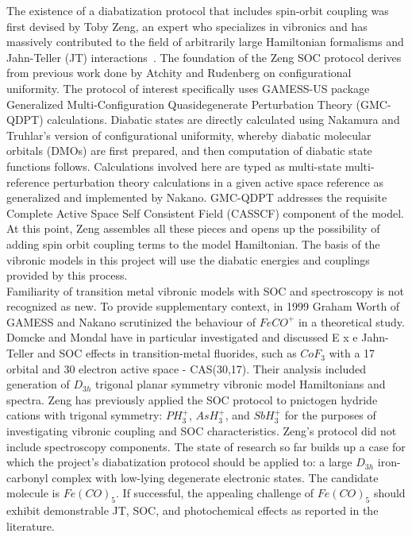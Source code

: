 The existence of a diabatization protocol that includes spin-orbit coupling was first devised by Toby Zeng, an expert who specializes in vibronics and has massively contributed to the field of arbitrarily large Hamiltonian formalisms and Jahn-Teller (JT) interactions~\cite{zeng2017diabatization}. The foundation of the Zeng SOC protocol derives from previous work done by Atchity and Rudenberg on configurational uniformity. The protocol of interest specifically uses GAMESS-US package Generalized Multi-Configuration Quasidegenerate Perturbation Theory (GMC-QDPT) calculations. Diabatic states are directly calculated using Nakamura and Truhlar's version of configurational uniformity, whereby diabatic molecular orbitals (DMOs) are first prepared, and then computation of diabatic state functions follows. Calculations involved here are typed as multi-state multi-reference perturbation theory calculations in a given active space reference as generalized and implemented by Nakano. GMC-QDPT addresses the requisite Complete Active Space Self Consistent Field (CASSCF) component of the model. At this point, Zeng assembles all these pieces and opens up the possibility of adding spin orbit coupling terms to the model Hamiltonian. The basis of the vibronic models in this project will use the diabatic energies and couplings provided by this process. \\ 

Familiarity of transition metal vibronic models with SOC and spectroscopy is not recognized as new. To provide supplementary context, in 1999 Graham Worth of GAMESS and Nakano scrutinized the behaviour of $FeCO^+$ in a theoretical study. Domcke and Mondal have in particular investigated and discussed E x e Jahn-Teller and SOC effects in transition-metal fluorides, such as $CoF_3$ with a 17 orbital and 30 electron active space - CAS(30,17). Their analysis included generation of $D_{3h}$ trigonal planar symmetry vibronic model Hamiltonians and spectra. Zeng has previously applied the SOC protocol to pnictogen hydride cations with trigonal symmetry: $PH_3^+$, $AsH_3^+$, and $SbH_3^+$ for the purposes of investigating vibronic coupling and SOC characteristics. Zeng's protocol did not include spectroscopy components. The state of research so far builds up a case for which the project's diabatization protocol should be applied to: a large $D_{3h}$ iron-carbonyl complex with low-lying degenerate electronic states. The candidate molecule is $Fe(CO)_5$. If successful, the appealing challenge of $Fe(CO)_5$ should exhibit demonstrable JT, SOC, and photochemical effects as reported in the literature.

